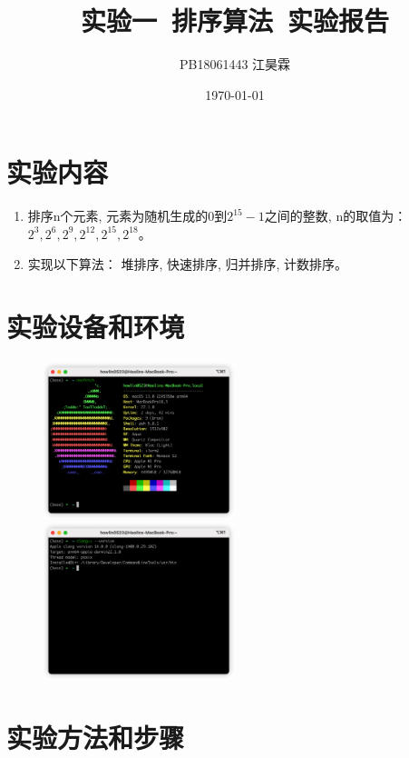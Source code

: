\documentclass[12pt, a4paper, oneside]{ctexart}
\title{\textbf{实验一\ 排序算法\ 实验报告}}
\author{PB18061443 江昊霖}
\date{\today}
\begin{document}
\maketitle

\section{实验内容}

\begin{enumerate}
    \item 排序n个元素, 元素为随机生成的0到$2^{15} - 1$之间的整数, n的取值为：
          $2^3, 2^6, 2^9, 2^{12}, 2^{15}, 2^{18}$。
    \item 实现以下算法： 堆排序, 快速排序, 归并排序, 计数排序。
\end{enumerate}

\section{实验设备和环境}

\begin{figure}[htbp]
    \includegraphics[width = 0.5\textwidth]{./image/info.png}
    \includegraphics[width = 0.5\textwidth]{./image/clang.png}
\end{figure}

\section{实验方法和步骤}
\end{document}
